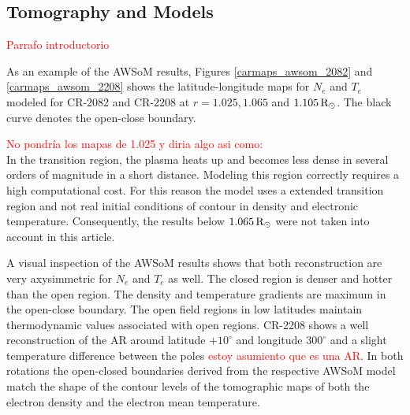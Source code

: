 \documentclass[namedreferences]{solarphysics}
\newcommand{\mdeg}{^\circ}
\newcommand{\mrsun}{{\rm R_\odot}}
\begin{document}
\begin{article}
\subsection{Tomography and Models}\label{awsom_res} 

\textcolor{red}{Parrafo introductorio}

As an example of the AWSoM results, Figures \ref{carmaps_awsom_2082} and \ref{carmaps_awsom_2208} shows the latitude-longitude maps for $N_e$ and $T_e$ modeled for CR-2082 and CR-2208 at $r=1.025, 1.065$ and $1.105\,\mrsun$. The black curve denotes the open-close boundary.

\textcolor{red}{No pondría los mapas de 1.025 y diria algo asi como:\\}
In the transition region, the plasma heats up and becomes less dense in several orders of magnitude in a short distance. Modeling this region correctly requires a high computational cost. For this reason the model uses a extended transition region and not real initial conditions of contour in density and electronic temperature. Consequently, the results below $1.065\,\mrsun$ were not taken into account in this article.

A visual inspection of the AWSoM results shows that both reconstruction are very axysimmetric for $N_e$ and $T_e$ as well. The closed region is denser and hotter than the open region. The density and temperature gradients are maximum in the open-close boundary. The open field regions in low latitudes maintain thermodynamic values associated with open regions. CR-2208 shows a well reconstruction of the AR around latitude $+10\mdeg$ and longitude $300\mdeg$ and a slight temperature difference between the poles \textcolor{red}{estoy asumiento que es una AR}. 
In both rotations the open-closed boundaries derived from the respective AWSoM model match the shape of the contour levels of the tomographic maps of both the electron density and the electron mean temperature.



\end{article}
\end{document}
